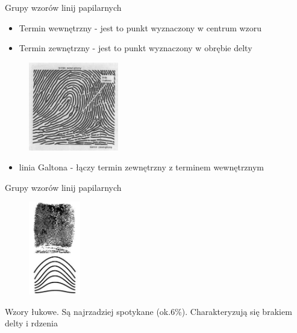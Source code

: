 \documentclass{beamer}
\begin{document}
\begin{frame}{Grupy wzorów linij papilarnych}
    \begin{itemize}
        \item{Termin wewnętrzny - jest to punkt wyznaczony w centrum wzoru}
        \item{Termin zewnętrzny - jest to punkt wyznaczony w obrębie delty}
    \end{itemize}
    \begin{figure}[t]
        \centering
        \includegraphics[width=0.35\textwidth]{fingerprints/liniaGaltona.png}
    \end{figure}
    \begin{itemize}
        \item{linia Galtona - łączy termin zewnętrzny z terminem wewnętrznym}
    \end{itemize}
\end{frame}

\begin{frame}{Grupy wzorów linij papilarnych}
    \begin{figure}[t]
        \centering
        \includegraphics[width=0.2\textwidth]{fingerprints/lukowy.jpg}
    \end{figure}
    Wzory łukowe.
    Są najrzadziej spotykane (ok.6\%). Charakteryzują się brakiem delty i rdzenia
\end{frame}
\end{document}
